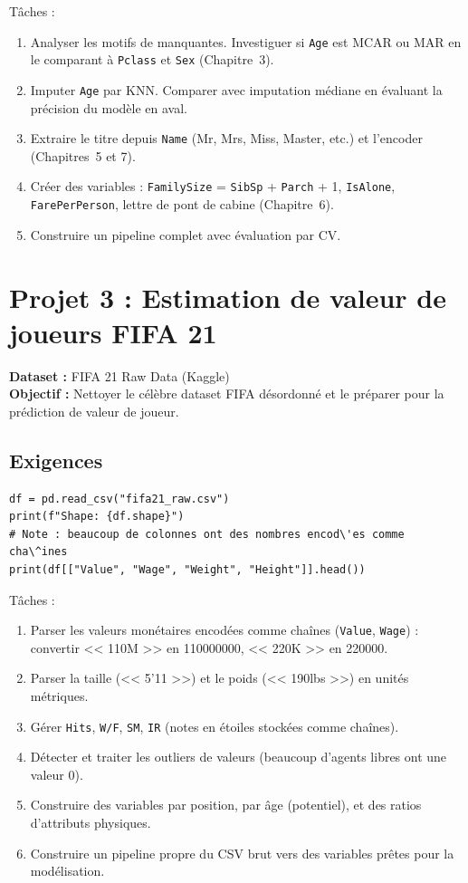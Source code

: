 T\^aches :
\begin{enumerate}
  \item Analyser les motifs de manquantes. Investiguer si \texttt{Age} est MCAR ou MAR en le comparant \`a \texttt{Pclass} et \texttt{Sex} (Chapitre~3).
  \item Imputer \texttt{Age} par KNN. Comparer avec imputation m\'ediane en \'evaluant la pr\'ecision du mod\`ele en aval.
  \item Extraire le titre depuis \texttt{Name} (Mr, Mrs, Miss, Master, etc.) et l'encoder (Chapitres~5 et 7).
  \item Cr\'eer des variables : \texttt{FamilySize} = \texttt{SibSp} + \texttt{Parch} + 1, \texttt{IsAlone}, \texttt{FarePerPerson}, lettre de pont de cabine (Chapitre~6).
  \item Construire un pipeline complet avec \'evaluation par CV.
\end{enumerate}

\section{Projet 3 : Estimation de valeur de joueurs FIFA 21}

\textbf{Dataset :} FIFA 21 Raw Data (Kaggle)\\
\textbf{Objectif :} Nettoyer le c\'el\`ebre dataset FIFA d\'esordonn\'e et le pr\'eparer pour la pr\'ediction de valeur de joueur.

\subsection{Exigences}

\begin{verbatim}
df = pd.read_csv("fifa21_raw.csv")
print(f"Shape: {df.shape}")
# Note : beaucoup de colonnes ont des nombres encod\'es comme cha\^ines
print(df[["Value", "Wage", "Weight", "Height"]].head())
\end{verbatim}

T\^aches :
\begin{enumerate}
  \item Parser les valeurs mon\'etaires encod\'ees comme cha\^ines (\texttt{Value}, \texttt{Wage}) : convertir << \texteuro110M >> en 110000000, << \texteuro220K >> en 220000.
  \item Parser la taille (<< 5'11 >>) et le poids (<< 190lbs >>) en unit\'es m\'etriques.
  \item G\'erer \texttt{Hits}, \texttt{W/F}, \texttt{SM}, \texttt{IR} (notes en \'etoiles stock\'ees comme cha\^ines).
  \item D\'etecter et traiter les outliers de valeurs (beaucoup d'agents libres ont une valeur 0).
  \item Construire des variables par position, par \^age (potentiel), et des ratios d'attributs physiques.
  \item Construire un pipeline propre du CSV brut vers des variables pr\^etes pour la mod\'elisation.
\end{enumerate}

